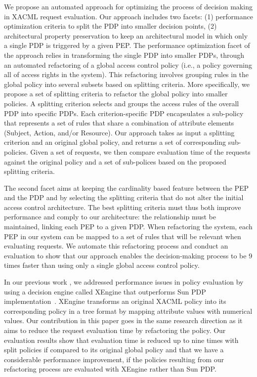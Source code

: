 We propose an automated approach for optimizing the process of decision making in XACML request evaluation. 
Our approach includes two facets: (1) performance optimization criteria to split the PDP into smaller decision points,
(2) architectural property preservation to keep an architectural model in which only a single PDP is triggered by a given PEP. 
The performance optimization facet of the approach relies in transforming the single PDP into smaller PDPs,
through an automated refactoring of a global access control policy (i.e., a policy governing all of access rights in the system).
This refactoring involves grouping rules in the global policy into several subsets based on splitting criteria. More specifically, we propose a set of splitting criteria to
 refactor the global policy into smaller policies.
A splitting criterion selects and groups the access rules of the overall PDP into specific PDPs.
Each criterion-specific PDP encapsulates a sub-policy that represents a set of rules that share a combination
of attribute elements (Subject, Action, and/or Resource). Our approach takes as input a splitting criterion and an original global policy, and returns a set of 
corresponding sub-policies. Given a set of requests, we then compare evaluation time of the requests against the original policy and a set of sub-polices 
based on the proposed splitting criteria.

The second facet aims at keeping the cardinality based feature between the PEP and the PDP and by selecting the splitting criteria that
do not alter the initial access control architecture. The best splitting criteria must thus both improve performance and comply to our architecture: the relationship must be maintained,
linking each PEP to a given PDP. When refactoring the system, each PEP in our system can be mapped to a set of rules that will be relevant when evaluating
requests. We automate this refactoring process and conduct an evaluation to show that our approach enables the decision-making process to be 9 times faster than
using only a single global access control policy.

In our previous work \cite{Xengine}, we addressed performance issues in policy evaluation by using
a decision engine called XEngine that outperforms Sun PDP implementation~\cite{oasis}. XEngine transforms an original XACML policy
into its corresponding policy in a tree format by mapping attribute values with numerical values.
Our contribution in this paper goes in the same research direction as it aims to reduce the request evaluation time by refactoring the policy.
Our evaluation results show that evaluation time is reduced up to nine times with split policies if compared to its original global policy 
and that we have a considerable performance improvement, if the policies resulting from our refactoring process are evaluated
with XEngine rather than Sun PDP.

